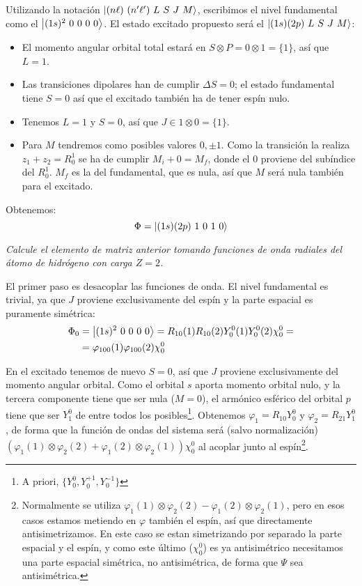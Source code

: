Utilizando la notación $\ket{(n\ell)\ (n'\ell')\ L\ S\ J\ M}$,
escribimos el nivel fundamental como el $\ket{(1s)^2\ 0\ 0\ 0\ 0}$. El
estado excitado propuesto será el $\ket{(1s)(2p)\ L\ S\ J\ M}$:
\begin{itemize}
\item El momento angular orbital total estará en $S\otimes P=0\otimes
  1 = \{1\}$, así que $L=1$.
\item Las transiciones dipolares han de cumplir $\Delta S = 0$; el
  estado fundamental tiene $S=0$ así que el excitado también ha de
  tener espín nulo.
\item Tenemos $L=1$ y $S=0$, así que $J\in1\otimes0=\{1\}$.
\item Para $M$ tendremos como posibles valores $0,\pm 1$. Como la
  transición la realiza $z_1+z_2 = R_0^1$ se ha de cumplir $M_i + 0 =
  M_f$, donde el $0$ proviene del subíndice del $R_0^1$. $M_f$ es la
  del fundamental, que es nula, así que $M$ será nula también para el excitado.
\end{itemize}

Obtenemos:
\begin{equation}
  \Phi = \ket{(1s)(2p)\ 1\ 0 \ 1 \ 0}
\end{equation}

\begin{tcolorbox}[halign=left]
  \emph{Calcule el elemento de matriz anterior tomando funciones de
    onda radiales del átomo de hidrógeno con carga $Z=2$.}
\end{tcolorbox}

El primer paso es desacoplar las funciones de onda.
El nivel fundamental es trivial, ya que $J$
proviene exclusivamente del espín y la parte espacial es puramente simétrica:
\begin{equation}
  \begin{split}
    \Phi_0 &= \ket{(1s)^2\ 0\ 0\ 0\ 0} =
    R_{10}(1)R_{10}(2)Y_0^0(1)Y_0^0(2)\chi_0^0 = \\
    &= \varphi_{100}(1)\varphi_{100}(2) \chi_0^0
  \end{split}
\end{equation}

En el excitado tenemos de nuevo $S=0$, así que $J$ proviene
exclusivamente del momento angular orbital. Como el orbital $s$ aporta
momento orbital nulo, y la tercera componente tiene que ser nula
($M=0$), el armónico esférico del orbital $p$ tiene que ser $Y_1^0$ de
entre todos los posibles\footnote{A priori,
  $\{Y_0^0,Y_0^{+1},Y_0^{-1}\}$}.
Obtenemos $\varphi_1 = R_{10}Y_0^0$ y $\varphi_2=R_{21}Y_1^0$, de
forma que la función de ondas del sistema será (salvo normalización)
$(\varphi_1(1)\otimes\varphi_2(2)+
\varphi_1(2)\otimes\varphi_2(1))\chi_0^0$ al acoplar junto al
espín\footnote{Normalmente se utiliza $\varphi_1(1)\otimes\varphi_2(2)
  - \varphi_1(2)\otimes\varphi_2(1)$, pero en esos casos estamos
metiendo en $\varphi$ también el espín, así que directamente
antisimetrizamos. En este caso se estan simetrizando por separado la
parte espacial y el espín, y como este último ($\chi_0^0$) es ya
antisimétrico necesitamos una parte espacial simétrica, no
antisimétrica, de forma que $\Psi$ sea antisimétrica.}.

